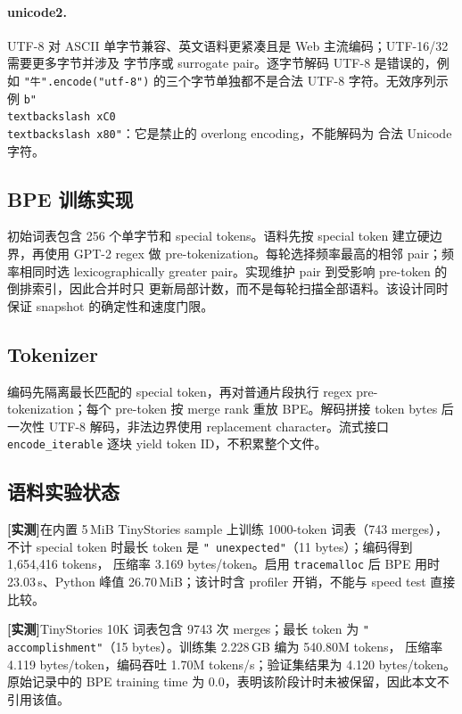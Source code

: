 \documentclass[UTF8,a4paper,11pt]{ctexart}
\newcommand{\measured}{\textbf{[实测]}}
\begin{document}
\paragraph{unicode2.}
UTF-8 对 ASCII 单字节兼容、英文语料更紧凑且是 Web 主流编码；UTF-16/32 需要更多字节并涉及
字节序或 surrogate pair。逐字节解码 UTF-8 是错误的，例如
\texttt{"牛".encode("utf-8")} 的三个字节单独都不是合法 UTF-8 字符。无效序列示例
\texttt{b"\\textbackslash xC0\\textbackslash x80"}：它是禁止的 overlong encoding，不能解码为
合法 Unicode 字符。

\subsection{BPE 训练实现}
初始词表包含 256 个单字节和 special tokens。语料先按 special token 建立硬边界，再使用
GPT-2 regex 做 pre-tokenization。每轮选择频率最高的相邻 pair；频率相同时选
lexicographically greater pair。实现维护 pair 到受影响 pre-token 的倒排索引，因此合并时只
更新局部计数，而不是每轮扫描全部语料。该设计同时保证 snapshot 的确定性和速度门限。

\subsection{Tokenizer}
编码先隔离最长匹配的 special token，再对普通片段执行 regex pre-tokenization；每个 pre-token
按 merge rank 重放 BPE。解码拼接 token bytes 后一次性 UTF-8 解码，非法边界使用 replacement
character。流式接口 \texttt{encode\_iterable} 逐块 yield token ID，不积累整个文件。

\subsection{语料实验状态}
\measured 在内置 5\,MiB TinyStories sample 上训练 1000-token 词表（743 merges），不计
special token 时最长 token 是 \texttt{" unexpected"}（11 bytes）；编码得到 1,654,416 tokens，
压缩率 3.169 bytes/token。启用 \texttt{tracemalloc} 后 BPE 用时 23.03\,s、Python 峰值
26.70\,MiB；该计时含 profiler 开销，不能与 speed test 直接比较。

\measured TinyStories 10K 词表包含 9743 次 merges；最长 token 为
\texttt{" accomplishment"}（15 bytes）。训练集 2.228\,GB 编为 540.80M tokens，
压缩率 4.119 bytes/token，编码吞吐 1.70M tokens/s；验证集结果为 4.120 bytes/token。
原始记录中的 BPE training time 为 0.0，表明该阶段计时未被保留，因此本文不引用该值。
\end{document}
